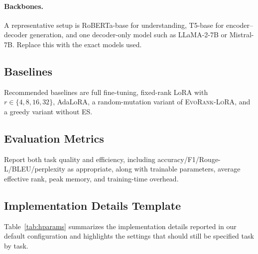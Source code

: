 \documentclass{article}
\newcommand{\method}{\textsc{EvoRank-LoRA}}
\begin{document}
\paragraph{Backbones.}
A representative setup is RoBERTa-base for understanding, T5-base for encoder--decoder generation, and one decoder-only model such as LLaMA-2-7B or Mistral-7B. Replace this with the exact models used.

\subsection{Baselines}
Recommended baselines are full fine-tuning, fixed-rank LoRA with $r \in \{4,8,16,32\}$, AdaLoRA, a random-mutation variant of \method, and a greedy variant without ES.

\subsection{Evaluation Metrics}
Report both task quality and efficiency, including accuracy/F1/Rouge-L/BLEU/perplexity as appropriate, along with trainable parameters, average effective rank, peak memory, and training-time overhead.

\subsection{Implementation Details Template}
Table~\ref{tab:hparams} summarizes the implementation details reported in our default configuration and highlights the settings that should still be specified task by task.
\end{document}
